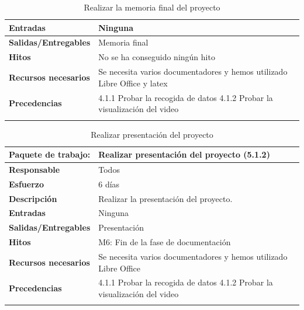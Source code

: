 \documentclass{report}
\begin{document}
\begin{center}
\begin{longtable}{|p{6cm}|p{6cm}|}
                    \hline
                    \textbf{Entradas} & Ninguna\\
                    \hline
                    \textbf{Salidas/Entregables} & Memoria final\\
                    \hline
                    \textbf{Hitos} & No se ha conseguido ningún hito\\
                    \hline
                    \textbf{Recursos necesarios} & Se necesita varios documentadores y hemos utilizado Libre Office y latex\\
                    \hline
                    \textbf{Precedencias} & 4.1.1 Probar la recogida de datos
                                            4.1.2 Probar la visualización del video\\
                    \hline
                    \caption{Realizar la memoria final del proyecto}
                \end{longtable}
                \clearpage
                \begin{longtable}{|p{6cm}|p{6cm}|}
                    \hline
                    \textbf{Paquete de trabajo:} & Realizar presentación del proyecto (5.1.2)\\
                    \hline
                    \textbf{Responsable} & Todos\\
                    \hline
                    \textbf{Esfuerzo} & 6 días\\
                    \hline
                    \textbf{Descripción} & Realizar la presentación del proyecto.\\
                    \hline
                    \textbf{Entradas} & Ninguna\\
                    \hline
                    \textbf{Salidas/Entregables} & Presentación\\
                    \hline
                    \textbf{Hitos} & M6: Fin de la fase de documentación\\
                    \hline
                    \textbf{Recursos necesarios} & Se necesita varios documentadores y hemos utilizado Libre Office\\
                    \hline
                    \textbf{Precedencias} & 4.1.1 Probar la recogida de datos
                                            4.1.2 Probar la visualización del video\\
                    \hline
                    \caption{Realizar presentación del proyecto}
                \end{longtable}
            \end{center}
           
\end{document}
